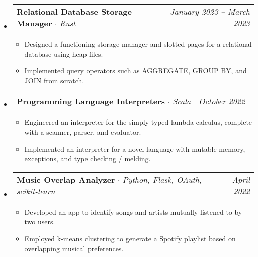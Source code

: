 \documentclass[letterpaper,11pt]{article}
\makeatletter
\newcommand{\resumeItem}[1]{
  \item\small{
    {#1 \vspace{-2pt}}
  }
}
\newcommand{\resumeProjectHeading}[2]{
    \item
    \begin{tabular*}{0.97\textwidth}{l@{\extracolsep{\fill}}r}
      \small#1 & #2 \\
    \end{tabular*}\vspace{-7pt}
}
\newcommand{\resumeSubHeadingListStart}{\begin{itemize}[leftmargin=0.125in, label={}]}
\newcommand{\resumeSubHeadingListEnd}{\end{itemize}}
\newcommand{\resumeItemListStart}{\begin{itemize}[leftmargin=0.185in]
}
\newcommand{\resumeItemListEnd}{\end{itemize}\vspace{-5pt}}
\makeatother
\begin{document}
\resumeSubHeadingListStart
      
      \resumeProjectHeading
          {\textbf{Relational Database Storage Manager} $\cdot$ \emph{Rust}}{\emph{January 2023 -- March 2023}}
          \resumeItemListStart
             \resumeItem{Designed a functioning storage manager and slotted pages for a relational database using heap files.}
        \resumeItem{Implemented query operators such as AGGREGATE, GROUP BY, and JOIN from scratch.}
          \resumeItemListEnd


  \resumeProjectHeading
          {\textbf{Programming Language Interpreters} $\cdot$ \emph{Scala}}{\emph{October 2022}}
    \resumeItemListStart
    \resumeItem{Engineered an interpreter for the simply-typed lambda calculus, complete with a scanner, parser, and evaluator.}
      \resumeItem{Implemented an interpreter for a novel language with mutable memory, exceptions, and type checking / melding.}
    \resumeItemListEnd

    \resumeProjectHeading
          {\textbf{Music Overlap Analyzer} $\cdot$ \emph{Python, Flask, OAuth, scikit-learn}}{\emph{April 2022}}
          \resumeItemListStart
             \resumeItem{Developed an app to identify songs and artists mutually listened to by two users.}
            \resumeItem{Employed k-means clustering to generate a Spotify playlist based on overlapping musical preferences.}
          \resumeItemListEnd
\resumeSubHeadingListEnd

  
\end{document}
